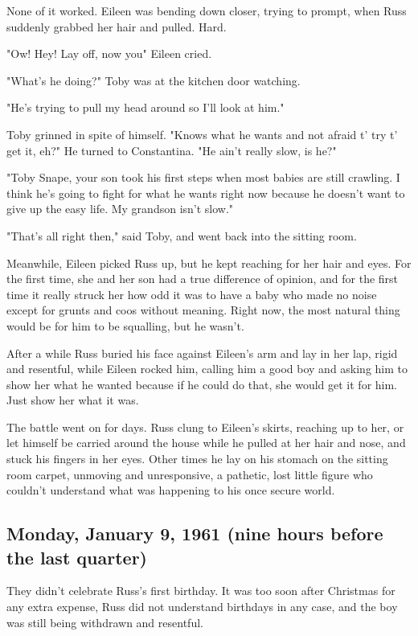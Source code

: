 None of it worked. Eileen was bending down closer, trying to prompt, when Russ suddenly grabbed her hair and pulled. Hard.

"Ow! Hey! Lay off, now you{\el}" Eileen cried.

"What's he doing?" Toby was at the kitchen door watching.

"He's trying to pull my head around so I'll look at him."

Toby grinned in spite of himself. "Knows what he wants and not afraid t' try t' get it, eh?" He turned to Constantina. "He ain't really slow, is he?"

"Toby Snape, your son took his first steps when most babies are still crawling. I think he's going to fight for what he wants right now because he doesn't want to give up the easy life. My grandson isn't slow."

"That's all right then," said Toby, and went back into the sitting room.

Meanwhile, Eileen picked Russ up, but he kept reaching for her hair and eyes. For the first time, she and her son had a true difference of opinion, and for the first time it really struck her how odd it was to have a baby who made no noise except for grunts and coos without meaning. Right now, the most natural thing would be for him to be squalling, but he wasn't.

After a while Russ buried his face against Eileen's arm and lay in her lap, rigid and resentful, while Eileen rocked him, calling him a good boy and asking him to show her what he wanted because if he could do that, she would get it for him. Just show her what it was.

The battle went on for days. Russ clung to Eileen's skirts, reaching up to her, or let himself be carried around the house while he pulled at her hair and nose, and stuck his fingers in her eyes. Other times he lay on his stomach on the sitting room carpet, unmoving and unresponsive, a pathetic, lost little figure who couldn't understand what was happening to his once secure world.

\subsection{Monday, January 9, 1961 (nine hours before the last quarter)}

They didn't celebrate Russ's first birthday. It was too soon after Christmas for any extra expense, Russ did not understand birthdays in any case, and the boy was still being withdrawn and resentful.

